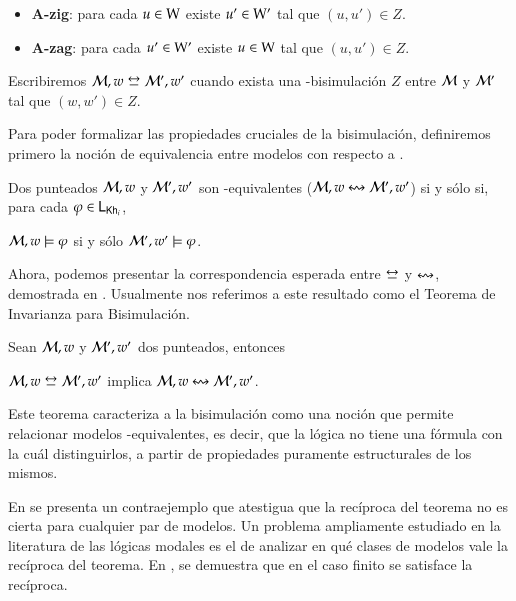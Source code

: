 \begin{definicion}
\begin{itemize}
        \item \textbf{A-zig}: para cada $u \in \mathrm{W}$ existe $u' \in \mathrm{W}'$ tal que $(u,u') \in Z$.

        \item \textbf{A-zag}: para cada $u' \in \mathrm{W}'$ existe $u \in \mathrm{W}$ tal que $(u,u') \in Z$.
    \end{itemize} 

    Escribiremos $\modults,w \bisim \modults',w'$ cuando exista una \KHilogic-bisimulación $Z$ entre
    $\mathcal{M}$ y $\mathcal{M}'$ tal que $(w,w') \in Z$.
\end{definicion}

Para poder formalizar las propiedades cruciales de la bisimulación, definiremos primero la noción de 
equivalencia entre modelos con respecto a \KHilogic.

\begin{definicion}
    Dos \ultss punteados $\mathcal{M},w$ y $\mathcal{M}',w'$ son \KHilogic-equivalentes ($\mathcal{M}, w \mathrel{\leftrightsquigarrow} \mathcal{M}', w'$)
    si y sólo si, para cada $\varphi \in \mathsf{L}_{\mathsf{Kh}_i}$,
    \begin{center}
        $\mathcal{M}, w \models \varphi$ \quad si y sólo \quad $\mathcal{M}', w' \models \varphi$.
    \end{center} 
\end{definicion}

Ahora, podemos presentar la correspondencia esperada entre $\bisim$ y $\mathrel{\leftrightsquigarrow}$, demostrada en \cite{ArecesFSV25,SaraviaPHD}.
Usualmente nos referimos a este resultado como el Teorema de Invarianza para Bisimulación.

\begin{teorema}\label{thm:bisim-implies-equivalence}
    Sean $\mathcal{M},w$ y $\mathcal{M}',w'$ dos \ultss punteados, entonces
    \begin{center}
        $\modults,w \bisim \modults',w'$ implica $\mathcal{M},w \mathrel{\leftrightsquigarrow} \mathcal{M}',w'$.
    \end{center}
\end{teorema}

Este teorema caracteriza a la bisimulación como una noción que permite relacionar modelos \KHilogic-equivalentes, es decir, que la lógica no tiene una fórmula con la cuál distinguirlos,
a partir de propiedades puramente estructurales de los mismos.

En \cite[Sección 2]{FervariVQW21} se presenta un contraejemplo que atestigua que la recíproca del teorema no es cierta para cualquier par de modelos.
Un problema ampliamente estudiado en la literatura de las lógicas modales es el de analizar en qué clases de modelos vale la recíproca del teorema.
En \cite{ArecesFSV25,SaraviaPHD}, se demuestra que en el caso finito se satisface la recíproca.

